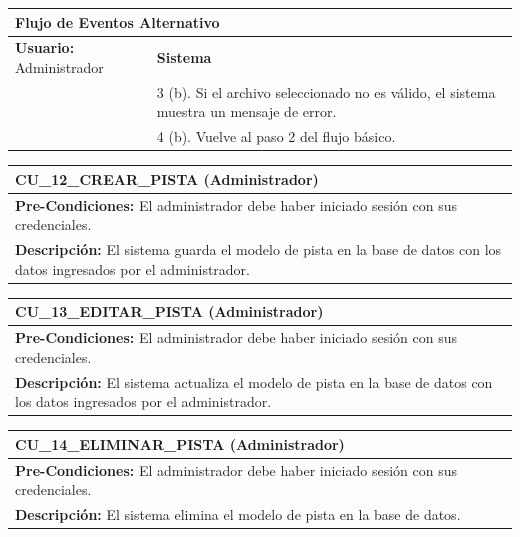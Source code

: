 \begin{center}
\begin{tabular}{| p{7.5cm} | p{7.5cm} |}
    \multicolumn{2}{|p{7.5cm}|}{\textbf{Flujo de Eventos Alternativo}} \\ \hline
    
    \multicolumn{1}{|p{7.5cm}|}{\textbf{Usuario:} Administrador} & \multicolumn{1}{|p{7.5cm}|}{\textbf{Sistema}} \\ \hline
    
    \multicolumn{1}{|p{7.5cm}|}{} & 
    \multicolumn{1}{|p{7.5cm}|}{3 (b). Si el archivo seleccionado no es válido, el sistema muestra un mensaje de error.}\\ \hline
    
    \multicolumn{1}{|p{7.5cm}|}{} & 
    \multicolumn{1}{|p{7.5cm}|}{4 (b). Vuelve al paso 2 del flujo básico.}\\ \hline
  \end{tabular}
\end{center}

\begin{center}
  \begin{tabular}{| p{7.5cm} | p{7.5cm} |}
    \hline
    \multicolumn{2}{|p{15cm}|}{\textbf{CU\_12\_CREAR\_PISTA} (Administrador)} \\ \hline
    \multicolumn{2}{|p{15cm}|}{\textbf{Pre-Condiciones:} El administrador debe haber iniciado sesión con sus credenciales.} \\ \hline
    \multicolumn{2}{|p{15cm}|}{\textbf{Descripción:} El sistema guarda el modelo de pista en la base de datos con los datos ingresados por el administrador. } \\
    \hline
  \end{tabular}
\end{center}

\begin{center}
  \begin{tabular}{| p{7.5cm} | p{7.5cm} |}
    \hline
    \multicolumn{2}{|p{15cm}|}{\textbf{CU\_13\_EDITAR\_PISTA} (Administrador)} \\ \hline
    \multicolumn{2}{|p{15cm}|}{\textbf{Pre-Condiciones:} El administrador debe haber iniciado sesión con sus credenciales.} \\ \hline
    \multicolumn{2}{|p{15cm}|}{\textbf{Descripción:} El sistema actualiza el modelo de pista en la base de datos con los datos ingresados por el administrador.} \\
    \hline
  \end{tabular}
\end{center}

\begin{center}
  \begin{tabular}{| p{7.5cm} | p{7.5cm} |}
    \hline
    \multicolumn{2}{|p{15cm}|}{\textbf{CU\_14\_ELIMINAR\_PISTA} (Administrador)} \\ \hline
    \multicolumn{2}{|p{15cm}|}{\textbf{Pre-Condiciones:} El administrador debe haber iniciado sesión con sus credenciales.} \\ \hline
    \multicolumn{2}{|p{15cm}|}{\textbf{Descripción:} El sistema elimina el modelo de pista en la base de datos.} \\
    \hline
  \end{tabular}
\end{center}


